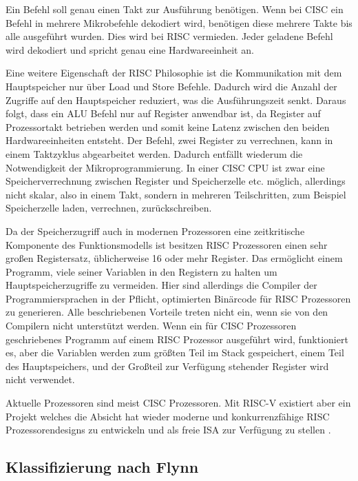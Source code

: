 \documentclass[12pt]{article}
\begin{document}
Ein Befehl soll genau einen Takt zur Ausführung benötigen. Wenn bei CISC ein Befehl in mehrere Mikrobefehle dekodiert wird, benötigen diese mehrere Takte bis alle ausgeführt wurden. Dies wird bei RISC vermieden. Jeder geladene Befehl wird dekodiert und spricht genau eine Hardwareeinheit an.

Eine weitere Eigenschaft der RISC Philosophie ist die Kommunikation mit dem Hauptspeicher nur über Load und Store Befehle. Dadurch wird die Anzahl der Zugriffe auf den Hauptspeicher reduziert, was die Ausführungszeit senkt. Daraus folgt, dass ein ALU Befehl nur auf Register anwendbar ist, da Register auf Prozessortakt betrieben werden und somit keine Latenz zwischen den beiden Hardwareeinheiten entsteht. Der Befehl, zwei Register zu verrechnen, kann in einem Taktzyklus abgearbeitet werden. Dadurch entfällt wiederum die Notwendigkeit der Mikroprogrammierung. In einer CISC CPU ist zwar eine Speicherverrechnung zwischen Register und Speicherzelle etc. möglich, allerdings nicht skalar, also in einem Takt, sondern in mehreren Teilschritten, zum Beispiel Speicherzelle laden, verrechnen, zurückschreiben.


Da der Speicherzugriff auch in modernen Prozessoren eine zeitkritische Komponente des Funktionsmodells ist besitzen RISC Prozessoren einen sehr großen Registersatz, üblicherweise 16 oder mehr Register. Das ermöglicht einem Programm, viele seiner Variablen in den Registern zu halten um Hauptspeicherzugriffe zu vermeiden. Hier sind allerdings die Compiler der Programmiersprachen in der Pflicht, optimierten Binärcode für RISC Prozessoren zu generieren. Alle beschriebenen Vorteile treten nicht ein, wenn sie von den Compilern nicht unterstützt werden. Wenn ein für CISC Prozessoren geschriebenes Programm auf einem RISC Prozessor ausgeführt wird, funktioniert es, aber die Variablen werden zum größten Teil im Stack gespeichert, einem Teil des Hauptspeichers, und der Großteil zur Verfügung stehender Register wird nicht verwendet. 
\par
Aktuelle Prozessoren sind meist CISC Prozessoren. Mit RISC-V existiert aber ein Projekt welches die Absicht hat wieder moderne und konkurrenzfähige RISC Prozessorendesigns zu entwickeln und als freie ISA zur Verfügung zu stellen . 
\subsection{Klassifizierung nach Flynn}
\end{document}
